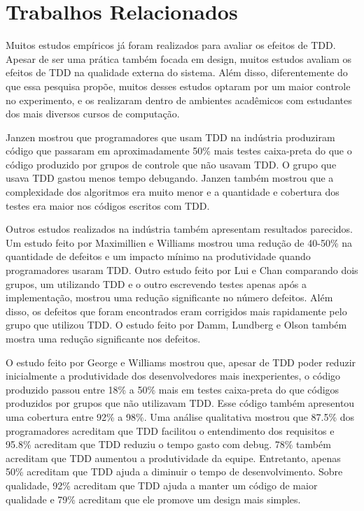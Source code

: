 \chapter{Trabalhos Relacionados}
\label{cap:trabalhos-relacionados}

Muitos estudos empíricos já foram realizados para avaliar os efeitos de TDD.
Apesar de ser uma prática também focada em design, muitos estudos avaliam
os efeitos de TDD na qualidade externa do sistema. Além disso, diferentemente
do que essa pesquisa propõe, muitos desses estudos optaram por um
maior controle no experimento, e os realizaram dentro de ambientes acadêmicos 
com estudantes dos mais diversos cursos de computação.

Janzen \cite{janzen-arch-improvement} mostrou que programadores que usam TDD na 
indústria produziram código que passaram em aproximadamente 50\% mais testes 
caixa-preta do que o código produzido por grupos de controle que não usavam TDD.
O grupo que usava TDD gastou menos tempo debugando. Janzen também 
mostrou que a complexidade dos algoritmos era muito menor e a quantidade e
cobertura dos testes era maior nos códigos escritos com TDD.

Outros estudos realizados na indústria também apresentam resultados parecidos.
Um estudo feito por Maximillien e Williams \cite{max-e-williams} mostrou uma
redução de 40-50\% na quantidade de defeitos e um impacto mínimo na
produtividade quando programadores usaram TDD. Outro estudo feito por Lui e
Chan \cite{lui-e-chan} comparando dois grupos, um utilizando TDD e o outro 
escrevendo testes apenas após a implementação, mostrou uma redução significante 
no número defeitos. Além disso, os defeitos que foram encontrados eram 
corrigidos mais rapidamente pelo grupo que utilizou TDD. O estudo feito por 
Damm, Lundberg e Olson \cite{damn-lundberg-e-olson} também mostra uma redução
significante nos defeitos.

O estudo feito por George e Williams \cite{george-e-williams} mostrou que,
apesar de TDD poder reduzir inicialmente a produtividade dos desenvolvedores 
mais inexperientes, o código produzido passou entre 18\% a 50\% mais em testes 
caixa-preta do que códigos produzidos por grupos que não utilizavam TDD. Esse
código também apresentou uma cobertura entre 92\% a 98\%. Uma análise
qualitativa mostrou que 87.5\% dos programadores acreditam que TDD facilitou o 
entendimento dos requisitos e 95.8\% acreditam que TDD reduziu o tempo gasto com
debug. 78\% também acreditam que TDD aumentou a produtividade da equipe. 
Entretanto, apenas 50\% acreditam que TDD ajuda a diminuir o tempo de 
desenvolvimento. Sobre qualidade, 92\% acreditam que TDD ajuda a manter um
código de maior qualidade e 79\% acreditam que ele promove um design mais simples.

